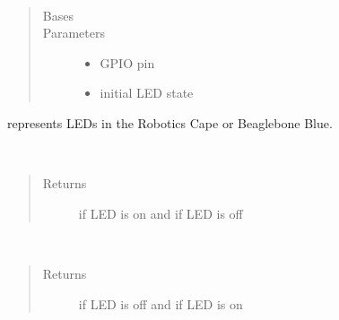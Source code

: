 \documentclass[letterpaper,10pt,english]{sphinxmanual}
\begin{document}
\begin{fulllineitems}
\label{\detokenize{index:rcpy.led.LED}}~\begin{quote}\begin{description}
\item[{Bases}] \leavevmode
{}

\item[{Parameters}] \leavevmode\begin{itemize}
\item {} 
 \textendash{} GPIO pin

\item {} 
 \textendash{} initial LED state

\end{itemize}

\end{description}\end{quote}

{\hyperref[\detokenize{index:rcpy.led.LED}]{}} represents LEDs in the Robotics Cape or Beaglebone Blue.

\begin{fulllineitems}
\label{\detokenize{index:rcpy.led.LED.is_on}}~\begin{quote}\begin{description}
\item[{Returns}] \leavevmode
{} if LED is on and  if LED is off

\end{description}\end{quote}

\end{fulllineitems}


\begin{fulllineitems}
\label{\detokenize{index:rcpy.led.LED.is_off}}~\begin{quote}\begin{description}
\item[{Returns}] \leavevmode
{} if LED is off and  if LED is on


\end{description}
\end{quote}
\end{fulllineitems}
\end{fulllineitems}
\end{document}
